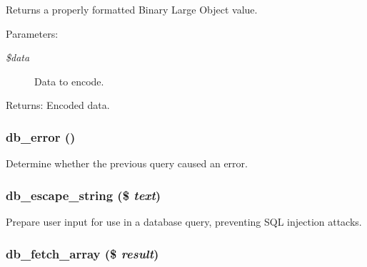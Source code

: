 Returns a properly formatted Binary Large Object value.

\begin{Desc}
\item[Parameters:]
\begin{description}
\item[{\em \$data}]Data to encode. \end{description}
\end{Desc}
\begin{Desc}
\item[Returns:]Encoded data. \end{Desc}
\hypertarget{database_8mysqli_8inc_5acae04a62f1baa2e83d189e72071bfe}{
\subsubsection[{db\_\-error}]{\setlength{\rightskip}{0pt plus 5cm}db\_\-error ()}}
\label{database_8mysqli_8inc_5acae04a62f1baa2e83d189e72071bfe}


Determine whether the previous query caused an error. \hypertarget{database_8mysqli_8inc_f7e6977f59f6a23327521ae3a89346f5}{
\subsubsection[{db\_\-escape\_\-string}]{\setlength{\rightskip}{0pt plus 5cm}db\_\-escape\_\-string (\$ {\em text})}}
\label{database_8mysqli_8inc_f7e6977f59f6a23327521ae3a89346f5}


Prepare user input for use in a database query, preventing SQL injection attacks. \hypertarget{database_8mysqli_8inc_2bd5f98fec7f21ee2c37f6b83785dcb9}{
\subsubsection[{db\_\-fetch\_\-array}]{\setlength{\rightskip}{0pt plus 5cm}db\_\-fetch\_\-array (\$ {\em result})}}
\label{database_8mysqli_8inc_2bd5f98fec7f21ee2c37f6b83785dcb9}


